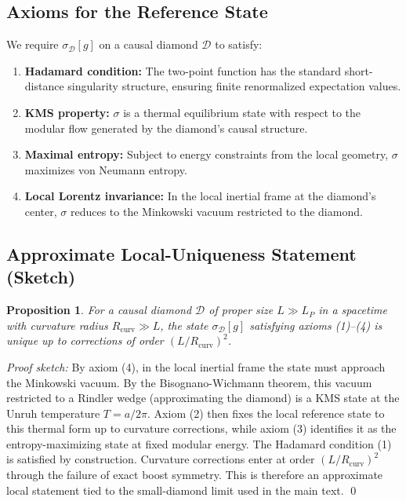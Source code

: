 \documentclass[aps,prd,twocolumn,superscriptaddress,nofootinbib,floatfix]{revtex4-2}
\newcommand{\Ddom}{\mathcal{D}}
\newtheorem{proposition}{Proposition}
\begin{document}
\subsection{Axioms for the Reference State}

We require $\sigma_{\Ddom}[g]$ on a causal diamond $\Ddom$ to satisfy:
\begin{enumerate}
    \item \textbf{Hadamard condition:} The two-point function has the standard short-distance singularity structure, ensuring finite renormalized expectation values.
    \item \textbf{KMS property:} $\sigma$ is a thermal equilibrium state with respect to the modular flow generated by the diamond's causal structure.
    \item \textbf{Maximal entropy:} Subject to energy constraints from the local geometry, $\sigma$ maximizes von Neumann entropy.
    \item \textbf{Local Lorentz invariance:} In the local inertial frame at the diamond's center, $\sigma$ reduces to the Minkowski vacuum restricted to the diamond.
\end{enumerate}

\subsection{Approximate Local-Uniqueness Statement (Sketch)}

\begin{proposition}
For a causal diamond $\Ddom$ of proper size $L \gg L_P$ in a spacetime with curvature radius $R_{\mathrm{curv}} \gg L$, the state $\sigma_{\Ddom}[g]$ satisfying axioms (1)--(4) is unique up to corrections of order $(L/R_{\mathrm{curv}})^2$.
\end{proposition}

\emph{Proof sketch:} By axiom (4), in the local inertial frame the state must approach the Minkowski vacuum. By the Bisognano-Wichmann theorem, this vacuum restricted to a Rindler wedge (approximating the diamond) is a KMS state at the Unruh temperature $T = a/2\pi$. Axiom (2) then fixes the local reference state to this thermal form up to curvature corrections, while axiom (3) identifies it as the entropy-maximizing state at fixed modular energy. The Hadamard condition (1) is satisfied by construction. Curvature corrections enter at order $(L/R_{\mathrm{curv}})^2$ through the failure of exact boost symmetry. This is therefore an approximate local statement tied to the small-diamond limit used in the main text. \qed
\end{document}
